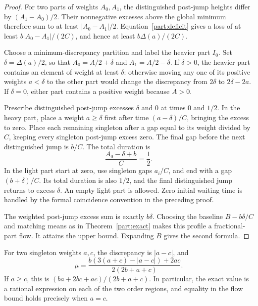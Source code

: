\documentclass[11pt,a4paper]{article}
\theoremstyle{remark}\newtheorem{remark}[theorem]{Remark}
\begin{document}
\begin{proof}
For two parts of weights $A_0,A_1$, the distinguished post-jump
heights differ by $(A_1-A_0)/2$.  Their nonnegative excesses above
the global minimum therefore sum to at least $|A_0-A_1|/2$.
Equation~\eqref{part:deficit} gives a loss of at least
$b|A_0-A_1|/(2C)$, and hence at least $b\Delta(a)/(2C)$.

Choose a minimum-discrepancy partition and label the heavier part
$I_0$.  Set $\delta=\Delta(a)/2$, so that
$A_0=A/2+\delta$ and $A_1=A/2-\delta$.  If $\delta>0$, the
heavier part contains an element of weight at least $\delta$:
otherwise moving any one of its positive weights $a<\delta$ to
the other part would change the discrepancy from $2\delta$ to
$2\delta-2a$.  If $\delta=0$, either part contains a positive
weight because $A>0$.

Prescribe distinguished post-jump excesses $\delta$ and $0$ at
times $0$ and $1/2$.  In the heavy part, place a weight
$a\ge\delta$ first after time $(a-\delta)/C$, bringing the excess
to zero.  Place each remaining singleton after a gap equal to its
weight divided by $C$, keeping every singleton post-jump excess
zero.  The final gap before the next distinguished jump is $b/C$.
The total duration is
\[
 \frac{A_0-\delta+b}{C}=\frac12.
\]
In the light part start at zero, use singleton gaps $a_i/C$, and
end with a gap $(b+\delta)/C$.  Its total duration is also $1/2$,
and the final distinguished jump returns to excess $\delta$.
An empty light part is allowed.  Zero initial waiting time is
handled by the formal coincidence convention in the preceding proof.

The weighted post-jump excess sum is exactly $b\delta$.  Choosing
the baseline $B-b\delta/C$ and matching means as in
Theorem~\ref{part:exact} makes this profile a fractional-part flow.
It attains the upper bound.  Expanding $B$ gives the second formula.
\end{proof}

For two singleton weights $a,c$, the discrepancy is $|a-c|$, and
\begin{equation}\label{part:twosingletons}
 \mu=\frac{b(3(a+c)-|a-c|)+2ac}{2(2b+a+c)}.
\end{equation}
If $a\ge c$, this is $(ba+2bc+ac)/(2b+a+c)$.  In particular,
the exact value is a rational expression on each of the two order
regions, and equality in the flow bound holds precisely when $a=c$.
\end{document}
